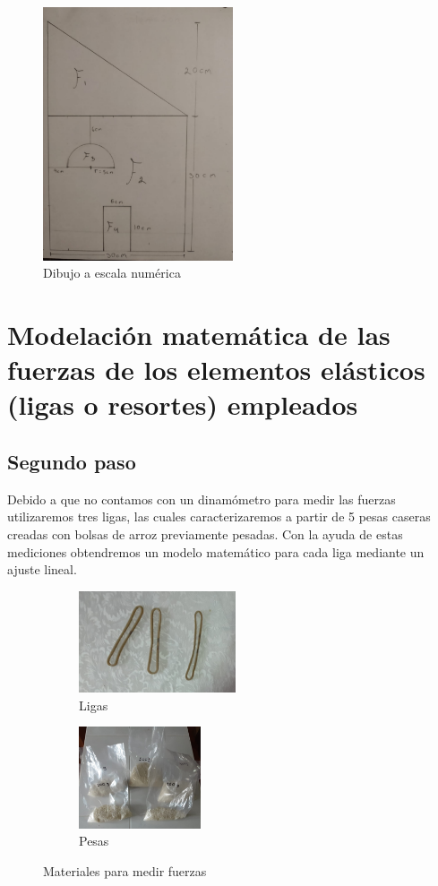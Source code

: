 \documentclass[12pt, titlepage]{report}
\begin{document}
    \begin{figure}[ht]
        \centering
        \includegraphics[width=0.5\textwidth]{Dibujo.jpg}
        \caption{Dibujo a escala numérica}
    \end{figure}

    \hfill
    \section{Modelación matemática de las fuerzas de los elementos elásticos (ligas o resortes) empleados}
    \subsection*{Segundo paso}
    Debido a que no contamos con un dinamómetro para medir las fuerzas utilizaremos tres ligas, las cuales caracterizaremos a partir de 5 pesas caseras creadas con bolsas de arroz previamente pesadas. Con la ayuda de estas mediciones obtendremos un modelo matemático para cada liga mediante un ajuste lineal.

    \begin{figure}[ht]
        \centering
        \begin{subfigure}[l]{0.4\textwidth}
            \centering
            \includegraphics[height=3cm]{Ligas.jpg}
            \caption{Ligas}
        \end{subfigure}
        \begin{subfigure}[3]{0.4\textwidth}
            \centering
            \includegraphics[height=3cm]{Pesas.jpg}
            \caption{Pesas}
        \end{subfigure}
        \caption{Materiales para medir fuerzas}
    \end{figure}
\end{document}

